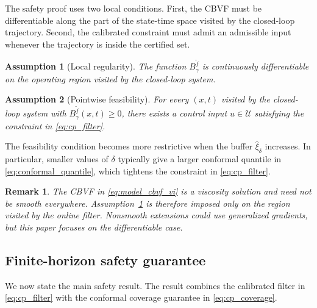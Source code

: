 \documentclass[letterpaper,10pt,conference]{ieeeconf}
\newtheorem{assumption}{Assumption}
\newtheorem{remark}{Remark}
\newcommand{\Bm}{B_{\gamma}^{\tilde f}}
\newcommand{\xv}{x}
\newcommand{\uv}{u}
\newcommand{\Uv}{\mathcal{U}}
\begin{document}
The safety proof uses two local conditions. First, the CBVF must be
differentiable along the part of the state-time space visited by the closed-loop
trajectory. Second, the calibrated constraint must admit an admissible input
whenever the trajectory is inside the certified set.

\begin{assumption}[Local regularity]
\label{ass:local_regularity}
The function $\Bm$ is continuously differentiable on the operating region
visited by the closed-loop system.
\end{assumption}

\begin{assumption}[Pointwise feasibility]
\label{ass:qp_feasibility}
For every $(\xv,t)$ visited by the closed-loop system with
$\Bm(\xv,t)\ge 0$, there exists a control input $\uv\in\Uv$ satisfying the
constraint in \eqref{eq:cp_filter}.
\end{assumption}

The feasibility condition becomes more restrictive when the buffer
$\widehat\xi_\delta$ increases. In particular, smaller values of $\delta$
typically give a larger conformal quantile in \eqref{eq:conformal_quantile},
which tightens the constraint in \eqref{eq:cp_filter}.

\begin{remark}
The CBVF in \eqref{eq:model_cbvf_vi} is a viscosity solution and need not be
smooth everywhere. Assumption~\ref{ass:local_regularity} is therefore imposed
only on the region visited by the online filter. Nonsmooth extensions could use
generalized gradients, but this paper focuses on the differentiable case.
\end{remark}

\subsection{Finite-horizon safety guarantee}

We now state the main safety result. The result combines the calibrated filter
in \eqref{eq:cp_filter} with the conformal coverage guarantee in
\eqref{eq:cp_coverage}.
\end{document}
